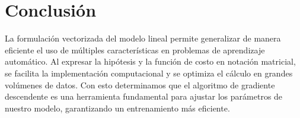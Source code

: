 \documentclass{iopjournal}
\begin{document}
\section{Conclusión}

La formulación vectorizada del modelo lineal permite generalizar de manera eficiente el uso de múltiples características en problemas de aprendizaje automático.
Al expresar la hipótesis y la función de costo en notación matricial, se facilita la implementación computacional y se optimiza el cálculo en grandes volúmenes de datos.
Con esto determinamos que el algoritmo de gradiente descendente es una herramienta fundamental para ajustar los parámetros de nuestro modelo, 
garantizando un entrenamiento más eficiente.

%
\end{document}
